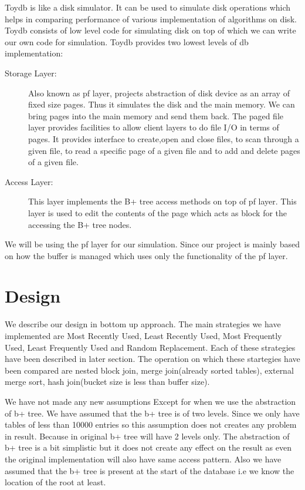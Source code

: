 Toydb is like a disk simulator. It can be used to simulate disk operations which helps in comparing performance of various implementation of algorithms on disk. Toydb consists of low level code for simulating disk on top of which we can write our own code for simulation. Toydb provides two lowest levels of db implementation:
\begin{description}
\item[Storage Layer: ] Also known as pf layer, projects abstraction of disk device as an array of fixed size pages. Thus it simulates the disk and the main memory. We can bring pages into the main memory and send them back. The paged file layer provides facilities to allow client layers to do file I/O in terms of pages. It provides interface to create,open and close files, to scan through a given file, to read a specific page of a given file and to add and delete pages of a given file.

\item[Access Layer: ] This layer implements the B+ tree access methods on top of pf layer. This layer is used to edit the contents of the page which acts as block for the accessing the B+ tree nodes.
\end{description}

We will be using the pf layer for our simulation. Since our project is mainly based on how the buffer is managed which uses only the functionality of the pf layer.

\section*{{Design}}

We describe our design in bottom up approach. The main strategies we have implemented are Most Recently Used, Least Recently Used, Most Frequently Used, Least Frequently Used and Random Replacement. Each of these strategies have been described in later section. The operation on which these startegies have been compared are nested block join, merge join(already sorted tables), external merge sort, hash join(bucket size is less than buffer size). 

We have not made any new assumptions Except for when we use the abstraction of b+ tree. We have assumed that the b+ tree is of two levels. Since we only have tables of less than 10000 entries so this assumption does not creates any problem in result. Because in original b+ tree will have 2 levels only. The abstraction of b+ tree is a bit simplistic but it does not create any effect on the result as even the original implementation will also have same access pattern. Also we have assumed that the b+ tree is present at the start of the database i.e we know the location of the root at least.

